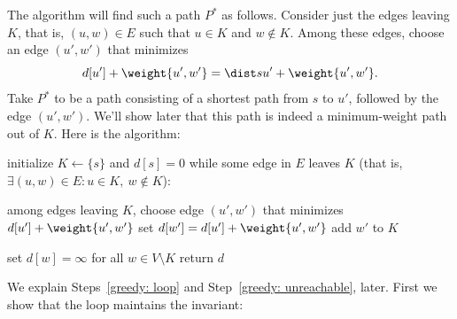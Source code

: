 The algorithm will find such a path $P^*$ as follows.
Consider just the edges leaving $K$,
that is, $(u,w)\in E$ such that $u\in K$ and $w\not\in K$.
Among these edges,
choose an edge $(u',w')$ that minimizes
\[d[u'] + \weight {u',w'} = \dist s {u'} + \weight {u',w'}.\]
Take $P^*$ to be a path consisting
of a shortest path from $s$ to $u'$, followed by the edge $(u', w')$.
We'll show later that this path is indeed a minimum-weight path out of $K$.
Here is the algorithm:

\begin{samepage}
  \begin{myframed}
    \begin{steps}
    \item[$\Dijkstra\big(G=(V,E), s\big)$:]
      \step initialize $K \leftarrow \{s\}$ and $d[s] = 0$
       while some edge in $E$ leaves $K$
      (that is, $\exists (u,w) \in E: u\in K,~w\not\in K$):
      \begin{block}
        \step among edges leaving $K$,
        choose edge $(u',w')$ that minimizes $d[u'] + \weight {u', w'}$
        \step set $d[w'] = d[u'] + \weight {u', w'}$
        \step add $w'$ to $K$
      \end{block}
       set $d[w] = \infty$ for all $w\in V\setminus K$
      \step return $d$
    \end{steps}
  \end{myframed}
\end{samepage}

We explain Steps~\ref{greedy: loop} and Step~\ref{greedy: unreachable}, later.
First we show that the loop maintains the invariant:

